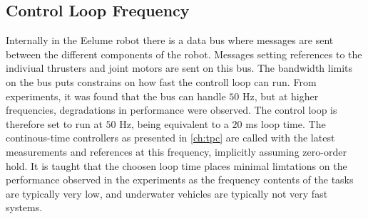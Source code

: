 \subsection*{Control Loop Frequency}
Internally in the Eelume robot there is a data bus where messages are sent
between the different components of the robot. Messages setting references
to the indiviual thrusters and joint motors are sent on this bus. The bandwidth
limits on the bus puts constrains on how fast the controll loop can run. From
experiments, it was found that the bus can handle \(50\) Hz, but at higher
frequencies, degradations in performance were observed. The control loop is
therefore set to run at \(50\) Hz, being equivalent to a \(20\) ms loop time.
The continous-time controllers as presented in \autoref{ch:tpc} are called with
the latest measurements and references at this frequency, implicitly assuming
zero-order hold.
It is taught that the choosen loop time places minimal limtations on the performance
observed in the experiments as the frequency contents of the tasks are typically
very low, and underwater vehicles are typically not very fast systems. 

